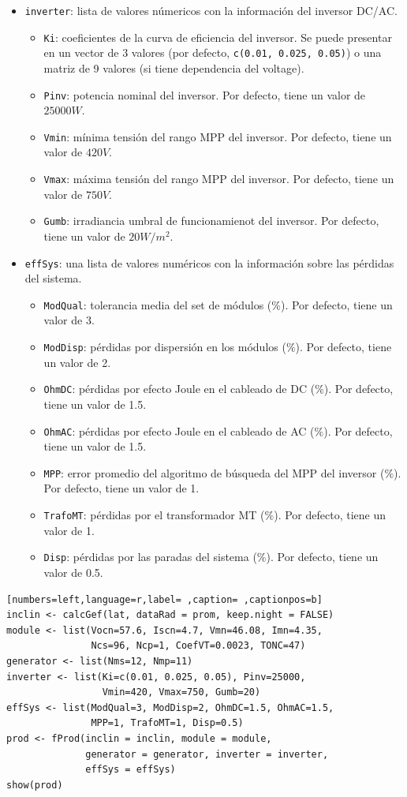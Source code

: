 \begin{itemize}
\begin{itemize}
\begin{itemize}
\end{itemize}
\item \texttt{inverter}: lista de valores númericos con la información del inversor DC/AC.
\begin{itemize}
\item \texttt{Ki}: coeficientes de la curva de eficiencia del inversor. Se puede presentar en un vector de 3 valores (por defecto, \texttt{c(0.01, 0.025, 0.05)}) o una matriz de 9 valores (si tiene dependencia del voltage).
\item \texttt{Pinv}: potencia nominal del inversor. Por defecto, tiene un valor de \(25000 W\).
\item \texttt{Vmin}: mínima tensión del rango MPP del inversor. Por defecto, tiene un valor de \(420V\).
\item \texttt{Vmax}: máxima tensión del rango MPP del inversor. Por defecto, tiene un valor de \(750V\).
\item \texttt{Gumb}: irradiancia umbral de funcionamienot del inversor. Por defecto, tiene un valor de \(20W/m^2\).
\end{itemize}
\item \texttt{effSys}: una lista de valores numéricos con la información sobre las pérdidas del sistema.
\begin{itemize}
\item \texttt{ModQual}: tolerancia media del set de módulos (\(\%\)). Por defecto, tiene un valor de 3.
\item \texttt{ModDisp}: pérdidas por dispersión en los módulos (\(\%\)). Por defecto, tiene un valor de 2.
\item \texttt{OhmDC}: pérdidas por efecto Joule en el cableado de DC (\(\%\)). Por defecto, tiene un valor de 1.5.
\item \texttt{OhmAC}: pérdidas por efecto Joule en el cableado de AC (\(\%\)). Por defecto, tiene un valor de 1.5.
\item \texttt{MPP}: error promedio del algoritmo de búsqueda del MPP del inversor (\(\%\)). Por defecto, tiene un valor de 1.
\item \texttt{TrafoMT}: pérdidas por el transformador MT (\(\%\)). Por defecto, tiene un valor de 1.
\item \texttt{Disp}: pérdidas por las paradas del sistema (\(\%\)). Por defecto, tiene un valor de 0.5.
\end{itemize}
\end{itemize}
\end{itemize}
\begin{lstlisting}[numbers=left,language=r,label= ,caption= ,captionpos=b]
inclin <- calcGef(lat, dataRad = prom, keep.night = FALSE)
module <- list(Vocn=57.6, Iscn=4.7, Vmn=46.08, Imn=4.35,
               Ncs=96, Ncp=1, CoefVT=0.0023, TONC=47)
generator <- list(Nms=12, Nmp=11)
inverter <- list(Ki=c(0.01, 0.025, 0.05), Pinv=25000,
                 Vmin=420, Vmax=750, Gumb=20)
effSys <- list(ModQual=3, ModDisp=2, OhmDC=1.5, OhmAC=1.5,
               MPP=1, TrafoMT=1, Disp=0.5)
prod <- fProd(inclin = inclin, module = module,
              generator = generator, inverter = inverter,
              effSys = effSys)
show(prod)
\end{lstlisting}

